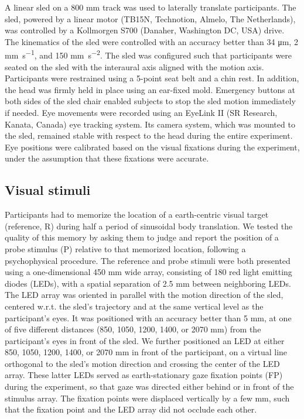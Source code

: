 A linear sled on a 800 \si{\milli\metre} track was used to laterally translate participants. The sled, powered by a linear motor (TB15N, Technotion, Almelo, The Netherlands), was controlled by a Kollmorgen S700 (Danaher, Washington DC, USA) drive. The kinematics of the sled were controlled with an accuracy better than 34 \si{\micro\metre}, 2 \si{\milli\metre\per\second}, and 150 \si{\milli\metre\per\square\second}. The sled was configured such that participants were seated on the sled with the interaural axis aligned with the motion axis. Participants were restrained using a 5-point seat belt and a chin rest. In addition, the head was firmly held in place using an ear-fixed mold.  Emergency buttons at both sides of the sled chair enabled subjects to stop the sled motion immediately if needed. Eye movements were recorded using an EyeLink II (SR Research, Kanata, Canada) eye tracking system. Its camera system, which was mounted to the sled, remained stable with respect to the head during the entire experiment. Eye positions were calibrated based on the visual fixations during the experiment, under the assumption that these fixations were accurate.

\subsection{Visual stimuli}

Participants had to memorize the location of a earth-centric visual target (reference, R) during half a period of sinusoidal body translation. We tested the quality of this memory by asking them to judge and report the position of a probe stimulus (P) relative to that memorized location, following a psychophysical procedure. The reference and probe stimuli were both presented using a one-dimensional 450 \si{\milli\metre} wide array, consisting of 180 red light emitting diodes (LEDs), with a spatial separation of 2.5 \si{\milli\metre} between neighboring LEDs. The LED array was oriented in parallel with the motion direction of the sled, centered w.r.t. the sled's trajectory and at the same vertical level as the participant's eyes. It was positioned with an accuracy better than 5 mm, at one of five different distances (850, 1050, 1200, 1400, or 2070 \si{\milli\metre}) from the participant's eyes in front of the sled. We further positioned an LED at either 850, 1050, 1200, 1400, or 2070 \si{\milli\metre} in front of the participant, on a virtual line orthogonal to the sled's motion direction and crossing the center of the LED array. These latter LEDs served as earth-stationary gaze fixation points (FP) during the experiment, so that gaze was directed either behind or in front of the stimulus array. The fixation points were displaced vertically by a few mm, such that the fixation point and the LED array did not occlude each other.

